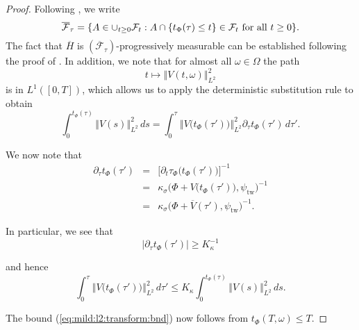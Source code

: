 \documentclass[10pt]{articleHJ}
\newcommand{\abs}[1]{\left\vert#1\right\vert}			%
\newcommand{\norm}[1]{\left\Vert#1\right\Vert}		%
\newcommand{\sref}[1]{(\ref{#1})}                       %
\numberwithin{equation}{section}
\begin{document}
\begin{proof}
Following \cite[{\S}1.2.3]{jeanblanc2009mathematical},
we write
\begin{equation}
\overline{\mathcal{F}}_{\tau}
= \{ A \in \cup_{t \ge 0} \mathcal{F}_t : A \cap
\{ t_{\Phi}(\tau) \le t \} \in \mathcal{F}_t
\hbox{ for all  } t \ge 0 \} .
\end{equation}
The fact that $\overline{H}$
is $(\overline{\mathcal{F}}_{\tau})$-progressively
measurable can be established following
the proof of \cite[Lem. 10.8(c)]{jacod2006calcul}.
In addition, we note that
for almost all $\omega \in \Omega$ the path
\begin{equation}
t \mapsto \norm{V(t, \omega)}_{L^2}^2
\end{equation}
is in $L^1([0,T])$, which allows us to
apply the deterministic substitution rule
to obtain
\begin{equation}
\int_{0}^{t_{\Phi}(\tau)}
\norm{V(s)}_{L^2}^2 \, ds
=
\int_0^{\tau}
\norm{V\big(t_{\Phi}(\tau')\big)}^2_{L^2}
\partial_\tau t_{\Phi}(\tau') \, d \tau' .
\end{equation}

We now note that
\begin{equation}
\begin{array}{lcl}
\partial_\tau t_{\Phi}(\tau')
 & = & \big[ \partial_t \tau_{\Phi}\big( t_{\Phi}(\tau') \big) \big]^{-1}
\\[0.2cm]
 & = &
    \kappa_{\sigma}\big(\Phi+ V\big(t_{\Phi}(\tau')\big) , \psi_{\mathrm{tw}} \big)^{-1}
\\[0.2cm]
  & = &
    \kappa_{\sigma}\big(\Phi+ \overline{V}(\tau') , \psi_{\mathrm{tw}} \big)^{-1}.
\end{array}
\end{equation}

In particular, we see that
\begin{equation}
\label{eq:md:low:bnd:deriv:t}
\abs{ \partial_\tau t_{\Phi}(\tau') } \ge K_{\kappa}^{-1}
\end{equation}

and hence
\begin{equation}
\int_0^{\tau}
\norm{V\big(t_{\Phi}(\tau')\big)}^2_{L^2} \, d \tau'
\le
K_{\kappa}
\int_{0}^{t_{\Phi}(\tau)}
\norm{V(s)}_{L^2}^2 \, ds .
\end{equation}

The bound \sref{eq:mild:l2:transform:bnd}
now follows from $t_{\Phi}(T,\omega) \le T$.


\end{proof}
\end{document}
